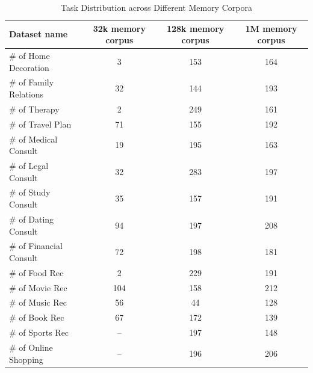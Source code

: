 \begin{table}[htbp]
\centering
\caption{Task Distribution across Different Memory Corpora}
\label{tab:taskdist}
    \begin{tabular}{lccc}
    \toprule
    \textbf{Dataset name} & \textbf{32k memory corpus} & \textbf{128k memory corpus} & \textbf{1M memory corpus} \\
    \midrule
    \# of Home Decoration   & 3   & 153 & 164 \\
    \# of Family Relations  & 32  & 144 & 193 \\
    \# of Therapy           & 2   & 249 & 161 \\
    \# of Travel Plan       & 71  & 155 & 192 \\
    \midrule
    \# of Medical Consult   & 19  & 195 & 163 \\
    \# of Legal Consult     & 32  & 283 & 197 \\
    \# of Study Consult     & 35  & 157 & 191 \\
    \# of Dating Consult    & 94  & 197 & 208 \\
    \# of Financial Consult & 72  & 198 & 181 \\
    \midrule
    \# of Food Rec          & 2   & 229 & 191 \\
    \# of Movie Rec         & 104 & 158 & 212 \\
    \# of Music Rec         & 56  & 44  & 128 \\
    \# of Book Rec          & 67  & 172 & 139 \\
    \# of Sports Rec        & --  & 197 & 148 \\
    \# of Online Shopping   & --  & 196 & 206 \\
    \bottomrule
    \end{tabular}
\vspace{-10pt}
\end{table}

